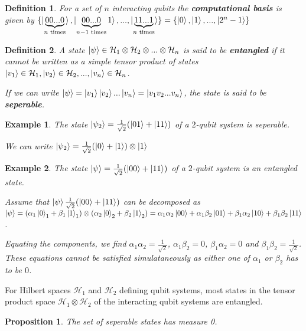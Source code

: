 \documentclass[12pt,twoside,fleqn]{report}
\theoremstyle{thmstyle}
\newtheorem{defn}{Definition}[chapter]
\newtheorem{eg}{Example}[chapter]
\newtheorem{prop}{Proposition}[chapter]
\begin{document}
\begin{defn}

    For a set of $n$ interacting qubits the \textbf{computational basis} is given by $\{ \ket{\underbrace{00...0}_{n \text{ times}}}, \ket{\underbrace{00...0}_{n-1 \text{ times}}1}, ... ,\ket{\underbrace{11...1}_{n \text{ times}}} \} = \{ \ket{0}, \ket{1}, ... , \ket{2^n - 1} \}$
\end{defn}




\begin{defn}
    A state $\ket{\psi} \in \mathcal{H}_1 \otimes \mathcal{H}_2 \otimes ... \otimes \mathcal{H}_n$ is said to be \textbf{entangled} if it cannot be written as a simple tensor product of states $\ket{v_1} \in \mathcal{H}_1, \ket{v_2} \in \mathcal{H}_2, ..., \ket{v_n} \in \mathcal{H}_n$. 

    If we can write $\ket{\psi} = \ket{v_1}\ket{v_2}...\ket{v_n} = \ket{v_1 v_2...v_n}$, the state is said to be \textbf{seperable}.
\end{defn}

\begin{eg}
The state $\ket{\psi_2} = \frac{1}{\sqrt{2}} (\ket{01} + \ket{11})$ of a $2$-qubit system is seperable. 

We can write $\ket{\psi_2} = \frac{1}{\sqrt{2}} (\ket{0} + \ket{1}) \otimes \ket{1}$
\end{eg}


\begin{eg}
The state $\ket{\psi} = \frac{1}{\sqrt{2}} (\ket{00} + \ket{11})$ of a $2$-qubit system is an entangled state.

    Assume that  $\ket{\psi} \frac{1}{\sqrt{2}} (\ket{00} + \ket{11}) $ can be decomposed as $\ket{\psi} = (\alpha_1 \ket{0}_1 + \beta_1 \ket{1}_1) \otimes (\alpha_2 \ket{0}_2 + \beta_2 \ket{1}_2) = \alpha_1 \alpha_2 \ket{00} + \alpha_1 \beta_2 \ket{01} + \beta_1 \alpha_2 \ket{10} + \beta_1 \beta_2 \ket{11}$.

    Equating the components, we find $\alpha_1 \alpha_2 = \displaystyle\frac{1}{\sqrt{2}}$, $\alpha_1 \beta_2 = 0$, $\beta_1 \alpha_2 = 0$ and $\beta_1 \beta_2 = \displaystyle\frac{1}{\sqrt{2}}$. These equations cannot be satisfied simulataneously as either one of $\alpha_1$ or $\beta_2$ has to be $0$.
\end{eg}


For Hilbert spaces $\mathcal{H}_1$ and $\mathcal{H}_2$ defining qubit systems, most states in the tensor product space $\mathcal{H}_1 \otimes \mathcal{H}_2$ of the interacting qubit systems are entangled.
\begin{prop}
    The set of seperable states has measure 0.
\end{prop}
\end{document}
